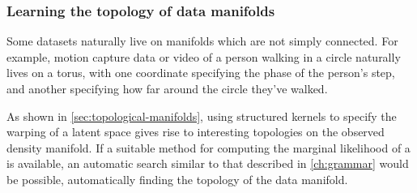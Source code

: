 \subsubsection{Learning the topology of data manifolds}

Some datasets naturally live on manifolds which are not simply connected.
For example, motion capture data or video of a person walking in a circle naturally lives on a torus, with one coordinate specifying the phase of the person's step, and another specifying how far around the circle they've walked.

As shown in \cref{sec:topological-manifolds}, using structured kernels to specify the warping of a latent space gives rise to interesting topologies on the observed density manifold.
If a suitable method for computing the marginal likelihood of a \gplvm{} is available, an automatic search similar to that described in \cref{ch:grammar} would be possible, automatically finding the topology of the data manifold.





%
%




